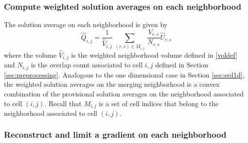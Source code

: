 
\subsubsection*{Compute weighted solution averages on each neighborhood}   

The solution average on each neighborhood is given by
\begin{equation}
\label{tiledef}
\widehat{Q}_{i,j} =  \frac{1}{{\widehat V}_{i,j}} \, \sum_{(r,s) \in M_{i,j}} \,  
\frac{V_{r,s}}{N_{r,s}}  \widehat{U}_{r,s}
\end{equation}
where the volume ${\widehat V}_{i,j}$ is the weighted neighborhood volume defined in \eqref{voldef} and $N_{i,j}$ is the overlap count associated to cell $i,j$ defined in Section \ref{sec:preprocessing}.  
Analogous to the one dimensional case in Section \ref{sec:srd1d}, the weighted solution averages on the merging neighborhood is a convex combination of the provisional solution averages on the neighborhood associated to cell $(i,j)$.  Recall that $M_{i,j}$ is a set of cell indices that belong to the neighborhood associated to cell $(i,j)$.






\subsubsection*{Reconstruct and limit a gradient on each neighborhood}


